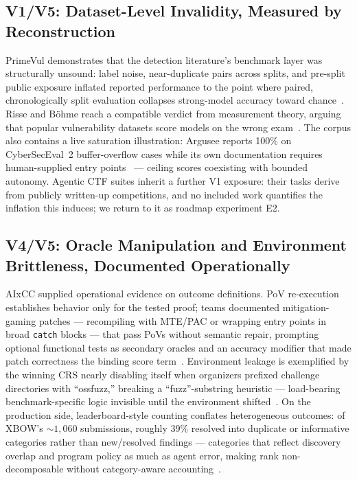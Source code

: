 \documentclass[conference,compsoc]{IEEEtran}
\begin{document}
\subsection{V1/V5: Dataset-Level Invalidity, Measured by Reconstruction}
PrimeVul demonstrates that the detection literature's benchmark layer was structurally
unsound: label noise, near-duplicate pairs across splits, and pre-split public exposure
inflated reported performance to the point where paired, chronologically split evaluation
collapses strong-model accuracy toward chance~\cite{primevul2024}. Risse and B\"ohme reach a
compatible verdict from measurement theory, arguing that popular vulnerability datasets score
models on the wrong exam~\cite{rissebohme-wrongexam2024}. The corpus also contains a live saturation
illustration: Argusee reports 100\% on CyberSecEval~2 buffer-overflow cases while its own
documentation requires human-supplied entry points~\cite{darknavyargusee2025} --- ceiling
scores coexisting with bounded autonomy. Agentic CTF suites inherit a further V1 exposure:
their tasks derive from publicly written-up competitions, and no included work quantifies the
inflation this induces; we return to it as roadmap experiment E2.

\subsection{V4/V5: Oracle Manipulation and Environment Brittleness, Documented Operationally}
AIxCC supplied operational evidence on outcome definitions. PoV re-execution establishes
behavior only for the tested proof; teams documented mitigation-gaming patches --- recompiling
with MTE/PAC or wrapping entry points in broad \texttt{catch} blocks --- that pass PoVs without
semantic repair, prompting optional functional tests as secondary oracles and an accuracy
modifier that made patch correctness the binding score term~\cite{taafc2025}. Environment
leakage is exemplified by the winning CRS nearly disabling itself when organizers prefixed
challenge directories with ``ossfuzz,'' breaking a ``fuzz''-substring heuristic --- load-bearing
benchmark-specific logic invisible until the environment shifted~\cite{taafc2025}. On the
production side, leaderboard-style counting conflates heterogeneous outcomes: of XBOW's
${\sim}1{,}060$ submissions, roughly 39\% resolved into duplicate or informative categories
rather than new/resolved findings --- categories that reflect discovery overlap and program
policy as much as agent error, making rank non-decomposable without category-aware
accounting~\cite{xbowtop12025}.
\end{document}
